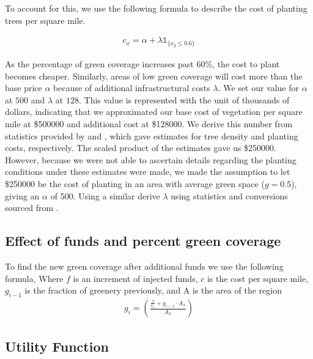 \documentclass[11pt]{article}
\begin{document}
To account for this, we use the following formula to describe the cost of planting trees per square mile.

\begin{equation}
\begin{aligned}
c_x = \alpha + \lambda \mathds{1}_{\{x_{g} \leq 0.6\}}
\end{aligned}
\end{equation}

As the percentage of green coverage increases past 60\%, the cost to plant becomes cheaper. Similarly, areas of low green coverage will cost more than the base price $\alpha$ because of additional infrastructural costs $\lambda$. We set our value for $\alpha$ at $500$ and $\lambda$ at $128$. This value is represented with the unit of thousands of dollars, indicating that we approximated our base cost of vegetation per square mile at \$500000 and additional cost at \$128000. We derive this number from statistics provided by \cite{satterfield_2013} and \cite{icprb_2021}, which gave estimates for tree density and planting costs, respectively. The scaled product of the estimates gave us \$250000. However, because we were not able to ascertain details regarding the planting conditions under these estimates were made, we made the assumption to let \$250000 be the cost of planting in an area with average green space ($g = 0.5$), giving an $\alpha$ of 500. Using a similar derive $\lambda$ using statistics and conversions sourced from \cite{kim_2007}.

\subsection{Effect of funds and percent green coverage}
To find the new green coverage after additional funds we use the following formula, Where $f$ is an increment of injected funds, $c$ is the cost per square mile, $g_{i-1}$ is the fraction of greenery previously, and A is the area of the region
\begin{equation}
\begin{aligned}
g_{i} = \left( \frac{\frac{f}{c_x} + g_{i-1} \cdot A_x}{A_x} \right)
\end{aligned}
\end{equation}

\subsection{Utility Function}
\end{document}
